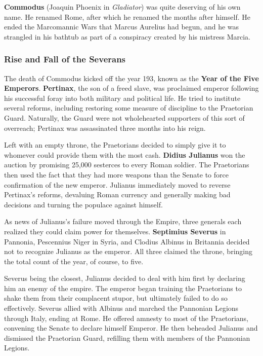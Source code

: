 \textbf{Commodus} (Joaquin Phoenix in \textit{Gladiator}) was quite deserving of his own name.
He renamed Rome, after which he renamed the months after himself.
He ended the Marcomannic Wars that Marcus Aurelius had begun,
and he was strangled in his bathtub as part of a conspiracy created by his mistress Marcia.

\subsubsection*{Rise and Fall of the Severans}

The death of Commodus kicked off the year 193, known as the \textbf{Year of the Five Emperors}.
\textbf{Pertinax}, the son of a freed slave,
was proclaimed emperor following his successful foray into both military and political life.
He tried to institute several reforms,
including restoring some measure of discipline to the Praetorian Guard.
Naturally, the Guard were not wholehearted supporters of this sort of overreach;
Pertinax was assassinated three months into his reign.

Left with an empty throne,
the Praetorians decided to simply give it to whomever could provide them with the most cash.
\textbf{Didius Julianus} won the auction by promising 25,000 sesterces to every Roman soldier.
The Praetorians then used the fact that they had more weapons than the Senate
to force confirmation of the new emperor.
Julianus immediately moved to reverse Pertinax's reforms,
devaluing Roman currency and generally making bad decisions
and turning the populace against himself.

As news of Julianus's failure moved through the Empire,
three generals each realized they could claim power for themselves.
\textbf{Septimius Severus} in Pannonia,
Pescennius Niger in Syria,
and Clodius Albinus in Britannia
decided not to recognize Julianus as the emperor.
All three claimed the throne, bringing the total count of the year, of course, to five.

Severus being the closest,
Julianus decided to deal with him first by declaring him an enemy of the empire.
The emperor began training the Praetorians to shake them from their complacent stupor,
but ultimately failed to do so effectively.
Severus allied with Albinus and marched the Pannonian Legions through Italy, ending at Rome.
He offered amnesty to most of the Praetorians,
convening the Senate to declare himself Emperor.
He then beheaded Julianus
and dismissed the Praetorian Guard, refilling them with members of the Pannonian Legions.

